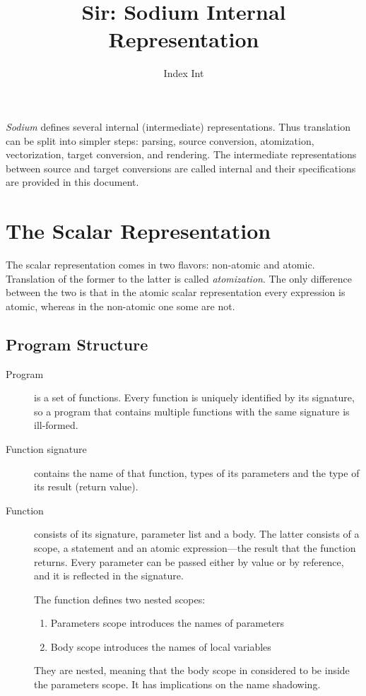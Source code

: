 \documentclass [a4paper] {article}
\title { Sir: Sodium Internal Representation }
\author { Index Int }
\begin{document}
\maketitle

\emph{Sodium} defines several internal (intermediate) representations. Thus
translation can be split into simpler steps: parsing, source conversion,
atomization, vectorization, target conversion, and rendering. The intermediate
representations between source and target conversions are called internal and
their specifications are provided in this document.

\section { The Scalar Representation }

The scalar representation comes in two flavors: non-atomic and atomic.
Translation of the former to the latter is called \emph{atomization}. The only
difference between the two is that in the atomic scalar representation
every expression is atomic, whereas in the non-atomic one some are not.

\subsection { Program Structure }

\begin {description}

\item [Program] is a set of functions. Every function is uniquely identified by
its signature, so a program that contains multiple functions with the same
signature is ill-formed.

\item [Function signature] contains the name of that function, types of its
parameters and the type of its result (return value).

\item [Function] consists of its signature, parameter list and a body. The
latter consists of a scope, a statement and an atomic expression---the result
that the function returns. Every parameter can be passed either by value or by
reference, and it is reflected in the signature.

The function defines two nested scopes:
\begin {enumerate}
\item Parameters scope introduces the names of parameters
\item Body scope introduces the names of local variables
\end {enumerate}

They are nested, meaning that the body scope in considered to be inside the
parameters scope. It has implications on the name shadowing.


\end {description}
\end{document}
